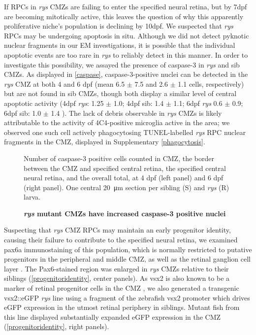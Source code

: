 If RPCs in \textit{rys} CMZs are failing to enter the specified neural retina, but by 7dpf are becoming mitotically active, this leaves the question of why this apparently proliferative niche's population is declining by 10dpf. We suspected that \textit{rys} RPCs may be undergoing apoptosis in situ. Although we did not detect pyknotic nuclear fragments in our EM investigations, it is possible that the individual apoptotic events are too rare in \textit{rys} to reliably detect in this manner. In order to investigate this possibility, we assayed the presence of caspase-3 in \textit{rys} and sib CMZs. As displayed in \autoref{caspase}, caspase-3-positive nuclei can be detected in the \textit{rys} CMZ at both 4 and 6 dpf (mean 6.5 $\pm$ 7.5 and 2.6 $\pm$ 1.1 cells, respectively) but are not found in sib CMZs, though both display a similar level of central apoptotic activity (4dpf \textit{rys}: 1.25 $\pm$ 1.0; 4dpf sib: 1.4 $\pm$ 1.1; 6dpf \textit{rys} 0.6 $\pm$ 0.9; 6dpf sib: 1.0 $\pm$ 1.4 ). The lack of debris observable in \textit{rys} CMZs is likely attributable to the activity of 4C4-positive microglia active in the area; we observed one such cell actively phagocytosing TUNEL-labelled \textit{rys} RPC nuclear fragments in the CMZ, displayed in Supplementary \autoref{phagocytosis}.

\begin{figure}[!h]
    \caption{{\bf \textit{rys} mutant CMZs have increased caspase-3 positive nuclei}}
    Number of caspase-3 positive cells counted in CMZ, the border between the CMZ and specified central retina, the specified central neural retina, and the overall total, at 4 dpf (left panel) and 6 dpf (right panel). One central \SI{20}{\micro\metre} section per sibling (S) and \textit{rys} (R) larva.
    \label{caspase}
\end{figure}

Suspecting that \textit{rys} CMZ RPCs may maintain an early progenitor identity, causing their failure to contribute to the specified neural retina, we examined pax6a immunostaining of this population, which is normally restricted to putative progenitors in the peripheral and middle CMZ, as well as the retinal ganglion cell layer \cite{Raymond2006}. The Pax6-stained region was enlarged in \textit{rys} CMZs relative to their siblings (\autoref{progenitoridentity}, center panels). As vsx2 is also known to be a marker of retinal progenitor cells in the CMZ \cite{Raymond2006}, we also generated a transgenic vsx2::eGFP \textit{rys} line using a fragment of the zebrafish vsx2 promoter which drives eGFP expression in the utmost retinal periphery in siblings. Mutant fish from this line displayed substantially expanded eGFP expression in the CMZ (\autoref{progenitoridentity}, right panels).


